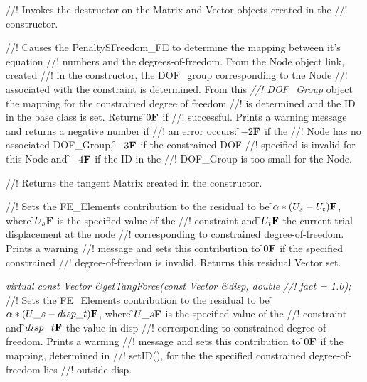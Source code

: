 //! Invokes the destructor on the Matrix and Vector objects created in the
//! constructor.

//! Causes the PenaltySFreedom\_FE to determine the mapping between it's equation
//! numbers and the degrees-of-freedom. From the Node object link, created
//! in the constructor, the DOF\_group corresponding to the Node
//! associated with the constraint is determined. From this {\em
//! DOF\_Group} object the mapping for the constrained degree of freedom
//! is determined and the ID in the base class is set. Returns \f$0{\bf F}$ if
//! successful. Prints a warning message and returns a negative number if
//! an error occurs: \f$-2{\bf F}$ if the
//! Node has no associated DOF\_Group, \f$-3{\bf F}$ if the constrained DOF
//! specified is invalid for this Node and \f$-4{\bf F}$ if the ID in the
//! DOF\_Group is too small for the Node. 

//! Returns the tangent Matrix created in the constructor.

//! Sets the FE\_Elements contribution to the residual to be
\f$\alpha * (U_s - U_t){\bf F}$, where \f$U_s{\bf F}$ is the specified value of the
//! constraint and \f$U_t{\bf F}$ the current trial displacement at the node
//! corresponding to constrained degree-of-freedom. Prints a warning
//! message and sets this contribution to \f$0{\bf F}$ if the specified constrained
//! degree-of-freedom is invalid. Returns this residual Vector set.


{\em virtual const Vector \&getTangForce(const Vector \&disp, double
//! fact = 1.0);    }
//! Sets the FE\_Elements contribution to the residual to be
\f$\alpha * (U\_s - disp\_t){\bf F}$, where \f$U\_s{\bf F}$ is the specified value of the
//! constraint and \f$disp\_t{\bf F}$ the value in \p disp
//! corresponding to constrained degree-of-freedom. Prints a warning
//! message and sets this contribution to \f$0{\bf F}$ if the mapping, determined in
//! setID(), for the the specified constrained degree-of-freedom lies 
//! outside \p disp.  










